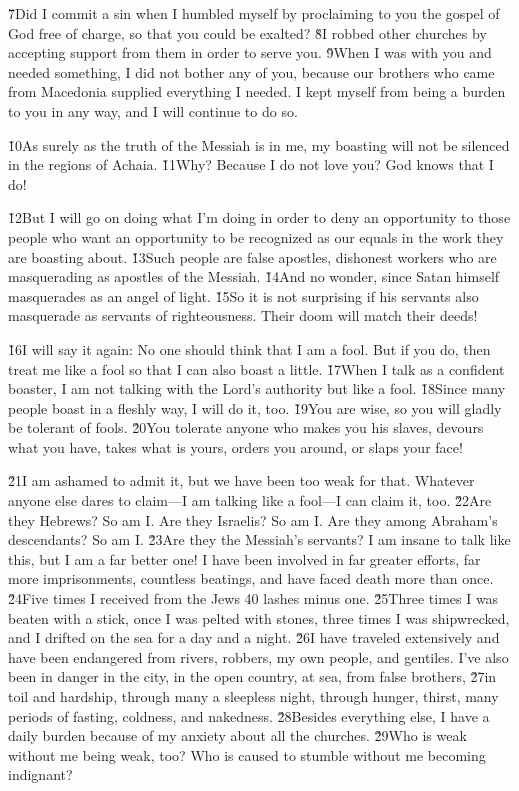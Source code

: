 \v{7}Did I commit a sin when I humbled myself by proclaiming to you the gospel of God free of charge, so that you could be exalted? \v{8}I robbed other churches by accepting support from them in order to serve you. \v{9}When I was with you and needed something, I did not bother any of you, because our brothers who came from Macedonia supplied everything I needed. I kept myself from being a burden to you in any way, and I will continue to do so.

\v{10}As surely as the truth of the Messiah is in me, my boasting will not be silenced in the regions of Achaia. \v{11}Why? Because I do not love you? God knows that I do!

\v{12}But I will go on doing what I'm doing in order to deny an opportunity to those people who want an opportunity to be recognized as our equals in the work they are boasting about. \v{13}Such people are false apostles, dishonest workers who are masquerading as apostles of the Messiah. \v{14}And no wonder, since Satan himself masquerades as an angel of light. \v{15}So it is not surprising if his servants also masquerade as servants of righteousness. Their doom will match their deeds!

\v{16}I will say it again: No one should think that I am a fool. But if you do, then treat me like a fool so that I can also boast a little. \v{17}When I talk as a confident boaster, I am not talking with the Lord's authority but like a fool. \v{18}Since many people boast in a fleshly way, I will do it, too. \v{19}You are wise, so you will gladly be tolerant of fools. \v{20}You tolerate anyone who makes you his slaves, devours what you have, takes what is yours, orders you around, or slaps your face!

\v{21}I am ashamed to admit it, but we have been too weak for that. Whatever anyone else dares to claim---I am talking like a fool---I can claim it, too. \v{22}Are they Hebrews? So am I. Are they Israelis? So am I. Are they among Abraham's descendants? So am I. \v{23}Are they the Messiah's servants? I am insane to talk like this, but I am a far better one! I have been involved in far greater efforts, far more imprisonments, countless beatings, and have faced death more than once. \v{24}Five times I received from the Jews 40 lashes minus one. \v{25}Three times I was beaten with a stick, once I was pelted with stones, three times I was shipwrecked, and I drifted on the sea for a day and a night. \v{26}I have traveled extensively and have been endangered from rivers, robbers, my own people, and gentiles. I've also been in danger in the city, in the open country, at sea, from false brothers, \v{27}in toil and hardship, through many a sleepless night, through hunger, thirst, many periods of fasting, coldness, and nakedness. \v{28}Besides everything else, I have a daily burden because of my anxiety about all the churches. \v{29}Who is weak without me being weak, too? Who is caused to stumble without me becoming indignant?

